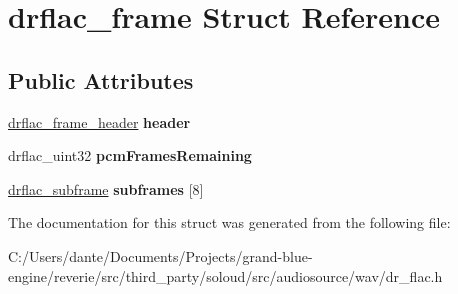 \hypertarget{structdrflac__frame}{}\section{drflac\+\_\+frame Struct Reference}
\label{structdrflac__frame}
\subsection*{Public Attributes}
\begin{DoxyCompactItemize}
\item 
\mbox{\label{structdrflac__frame_a0c1c7ba3aeb2a987e0812f38b4974399}} 
\mbox{\hyperlink{structdrflac__frame__header}{drflac\+\_\+frame\+\_\+header}} {\bfseries header}
\item 
\mbox{\label{structdrflac__frame_a1866b7d908ef1ed678e7bd138f608582}} 
drflac\+\_\+uint32 {\bfseries pcm\+Frames\+Remaining}
\item 
\mbox{\label{structdrflac__frame_aa50de16bb64d5830fc278bb390bfc4a9}} 
\mbox{\hyperlink{structdrflac__subframe}{drflac\+\_\+subframe}} {\bfseries subframes} \mbox{[}8\mbox{]}
\end{DoxyCompactItemize}


The documentation for this struct was generated from the following file\+:\begin{DoxyCompactItemize}
\item 
C\+:/\+Users/dante/\+Documents/\+Projects/grand-\/blue-\/engine/reverie/src/third\+\_\+party/soloud/src/audiosource/wav/dr\+\_\+flac.\+h\end{DoxyCompactItemize}
